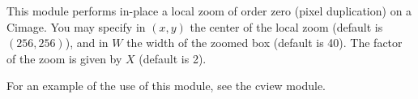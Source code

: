 This module performs in-place a local zoom of order zero 
(pixel duplication) on a Cimage.
You may specify in $(x,y)$ the center of the local zoom (default
is $(256,256)$), and in $W$ the width of the zoomed box (default is 40).
The factor of the zoom is given by $X$ (default is 2).

For an example of the use of this module, see the cview module.

